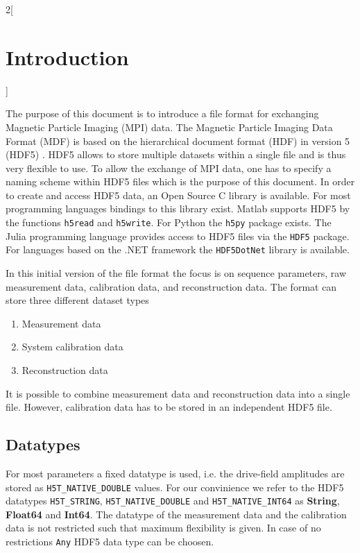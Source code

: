 \documentclass[landscape]{article} %
\newcommand{\inl}[1]{\lstinline[columns=fixed]{#1}}
\newcommand{\inltab}[1]{{\ttfamily\bfseries\color{blue}#1}}
\begin{document}
\begin{multicols}{2}[\section{Introduction} \label{Sec:Introduction}]

	The purpose of this document is to introduce a file format for exchanging Magnetic Particle Imaging (MPI) data. The Magnetic Particle Imaging Data Format (MDF) is based on the hierarchical document format (HDF) in version 5 (HDF5) \cite{hdf5}. HDF5 allows to store multiple datasets within a single file and is thus very flexible to use. To allow the exchange of MPI data, one has to specify a naming scheme within HDF5 files which is the purpose of this document. In order to create and access HDF5 data, an Open Source C library is available. For most programming languages bindings to this library exist. Matlab supports HDF5 by the functions \inl{h5read} and \inl{h5write}. For Python the \inl{h5py} package exists. The Julia programming language provides access to HDF5 files via the \inl{HDF5} package. For languages based on the .NET framework the \inl{HDF5DotNet} library is available.

In this initial version of the file format the focus is on sequence parameters, raw measurement data, calibration data, and reconstruction data. The format can store three different dataset types
\begin{enumerate}
\setlength{\itemsep}{0pt}
\item Measurement data
\item System calibration data
\item Reconstruction data
\end{enumerate}
It is possible to combine measurement data and reconstruction data into a single file. However, calibration data has to be stored in an independent HDF5 file.

\subsection{Datatypes}

For most parameters a fixed datatype is used, i.e. the drive-field amplitudes are stored as \inl{H5T_NATIVE_DOUBLE} values. For our convinience we refer to the HDF5 datatypes \inl{H5T_STRING}, \inl{H5T_NATIVE_DOUBLE} and \inl{H5T_NATIVE_INT64} as \inltab{String}, \inltab{Float64} and \inltab{Int64}. The datatype of the measurement data and the calibration data is not restricted such that maximum flexibility is given. In case of no restrictions \inl{Any} HDF5 data type can be choosen.


\end{multicols}
\end{document}
